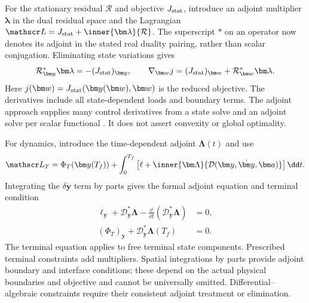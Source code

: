 For the stationary residual $\mathcal R$ and objective $J_{\rm stat}$, introduce
an adjoint multiplier $\bm\lambda$ in the dual residual space and the Lagrangian
$\mathscr L=J_{\rm stat}+\inner{\bm\lambda}{\mathcal R}$. The superscript
$\ast$ on an operator now denotes its adjoint in the stated real duality
pairing, rather than scalar conjugation. Eliminating state variations gives
\begin{equation}
 \mathcal R_{\bm y}^{\ast}\bm\lambda
        =-(J_{\rm stat})_{\bm y},\qquad
 \nabla_{\bm w}j=(J_{\rm stat})_{\bm w}
                       +\mathcal R_{\bm w}^{\ast}\bm\lambda.
 \label{eq:stationary-adjoint}
\end{equation}
Here $j(\bm w)=J_{\rm stat}(\bm y(\bm w),\bm w)$ is the reduced objective.
The derivatives include all state-dependent loads and boundary terms.
The adjoint approach supplies many control derivatives from a state solve and
an adjoint solve per scalar functional \cite{giles2000}. It does not assert
convexity or global optimality.

For dynamics, introduce the time-dependent adjoint $\bm\Lambda(t)$ and use
\begin{equation}
 \mathscr L_T=\Phi_T(\bm y(T_f))+
   \int_0^{T_f}\left[\ell+
        \inner{\bm\Lambda}{\mathcal D(\bm y,\dot{\bm y},\bm a)}\right]\dd t.
 \label{eq:dynamic-lagrangian}
\end{equation}
Integrating the $\delta\dot{\bm y}$ term by parts gives the formal adjoint
equation and terminal condition
\begin{align}
 \ell_{\bm y}+\mathcal D_{\bm y}^{\ast}\bm\Lambda
       -\frac{\dd}{\dd t}
            (\mathcal D_{\dot{\bm y}}^{\ast}\bm\Lambda)&=0,
 \label{eq:dynamic-adjoint}\\
 (\Phi_T)_{\bm y}
       +\mathcal D_{\dot{\bm y}}^{\ast}\bm\Lambda(T_f)&=0.
 \label{eq:adjoint-terminal}
\end{align}
The terminal equation applies to free terminal state components. Prescribed
terminal constraints add multipliers. Spatial integrations by parts provide
adjoint boundary and interface conditions; these depend on the actual physical
boundaries and objective and cannot be universally omitted. Differential--
algebraic constraints require their consistent adjoint treatment or elimination.

